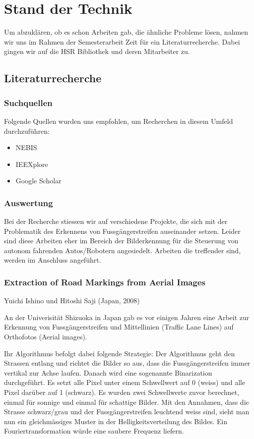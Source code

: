 \section{Stand der Technik}
Um abzuklären, ob es schon Arbeiten gab, die ähnliche Probleme lösen, nahmen wir uns im Rahmen der Semesterarbeit Zeit für ein Literaturrecherche. Dabei gingen wir auf die HSR Bibliothek und deren Mitarbeiter zu.
\subsection{Literaturrecherche}
\subsubsection{Suchquellen}
Folgende Quellen wurden uns empfohlen, um Recherchen in diesem Umfeld durchzuführen:
\begin{itemize}
	\item NEBIS \cite{NEBIS}
    \item IEEXplore \cite{IEEXplore}
    \item Google Scholar \cite{GoogleScholar}
\end{itemize}

\subsubsection{Auswertung}
Bei der Recherche stiessen wir auf verschiedene Projekte, die sich mit der Problematik des Erkennens von Fussgängerstreifen auseinander setzen. Leider sind diese Arbeiten eher im Bereich der Bilderkennung für die Steuerung von autonom fahrenden Autos/Robotern angesiedelt. Arbeiten die treffender sind, werden im Anschluss angeführt.
\subsubsection{Extraction of Road Markings from Aerial Images}
Yuichi Ishino und Hitoshi Saji (Japan, 2008)\cite{ishino2008extraction} \newline 

An der Univerisität Shizuoka in Japan gab es vor einigen Jahren eine Arbeit zur Erkennung von Fussgängerstreifen und Mittellinien (Traffic Lane Lines) auf Orthofotos (Aerial images).

Ihr Algorithmus befolgt dabei folgende Strategie:
Der Algorithmus geht den Strassen entlang und richtet die Bilder so aus, dass die Fussgängerstreifen immer vertikal zur Achse laufen. Danach wird eine sogenannte Binarization durchgeführt. Es setzt alle Pixel unter einem Schwellwert auf 0 (weiss) und alle Pixel darüber auf 1 (schwarz). Es wurden zwei Schwellwerte zuvor berechnet, einmal für sonnige und einmal für schattige Bilder.
Mit den Annahmen, dass die Strasse schwarz/grau und der Fussgängerstreifen leuchtend weiss sind, sieht man nun ein gleichmässiges Muster in der Helligkeitsverteilung des Bildes. Ein Fouriertransformation würde eine saubere Frequenz liefern.

